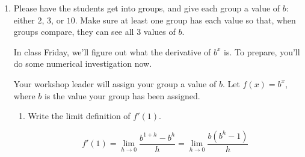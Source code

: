\documentclass{article}
\begin{document}
\begin{enumerate}
\begin{enumerate}
  \item

    \begin{workshop}
      We can use exactly the same reasoning here, except now the population is shrinking. So, in the first hour, the population will decrease by 50 bacteria. In each hour after that, it will decrease by less than 50 bacteria. So, over 10 hours, it will decrease by less than 500 bacteria. 
    \end{workshop}

    \begin{problem}[\vfill]
      The population of the second colony decreases by 5\% per hour. In the next 10 hours, will it decrease by exactly 50\%, more than 50\%, or less than 50\% of its current size? Explain how you know. 
    \end{problem}

    \begin{solution}
    The population will decrease by less than 50\% of it's current size. Every hour, the population decreases, so ``5\% of the population'' is a smaller amount every hour. The population decreases by a smaller amount every hour. 
    \end{solution}

  \end{enumerate}

\item  \label{numerically-approximate-derivative-of-b^x}

  \begin{workshop}
    Please have the students get into groups, and give each group a value of $b$: either $2$, $3$, or $10$. Make sure at least one group has each value so that, when groups compare, they can see all 3 values of $b$. 
  \end{workshop}

  In class Friday, we'll figure out what the derivative of $b^x$ is. To prepare, you'll do some numerical investigation now.

  Your workshop leader will assign your group a value of $b$. Let $f(x) = b^x$, where $b$ is the value your group has been assigned.

  \begin{enumerate}
  \item
    \begin{problem}[0.35in]
      Write the limit definition of $f'(1)$.
    \end{problem}

    \begin{solution}
        $$f'(1) = \lim_{h \to 0} \dfrac{b^{1+h}-b^h}{h} = \lim_{h \to 0} \dfrac{b(b^h-1)}{h}$$
    \end{solution}


\end{enumerate}
\end{enumerate}
\end{document}
